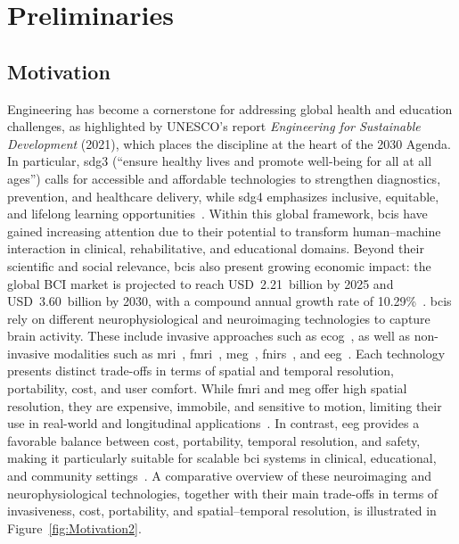 \chapter{Preliminaries}

\section{Motivation} Engineering has become a cornerstone for addressing global health and education challenges, as highlighted by UNESCO’s report \emph{Engineering for Sustainable Development} (2021), which places the discipline at the heart of the 2030 Agenda. In particular, \gls{sdg3} (“ensure healthy lives and promote well-being for all at all ages”) calls for accessible and affordable technologies to strengthen diagnostics, prevention, and healthcare delivery, while \gls{sdg4} emphasizes inclusive, equitable, and lifelong learning opportunities~\cite{nair2021engineering,de2018agenda}. Within this global framework, \glspl{bci} have gained increasing attention due to their potential to transform human–machine interaction in clinical, rehabilitative, and educational domains. Beyond their scientific and social relevance, \glspl{bci} also present growing economic impact: the global BCI market is projected to reach USD~2.21~billion by 2025 and USD~3.60~billion by 2030, with a compound annual growth rate of 10.29\%~\cite{mordor2025bci}. \glspl{bci} rely on different neurophysiological and neuroimaging technologies to capture brain activity. These include invasive approaches such as \gls{ecog}~\cite{leuthardt2004ecog}, as well as non-invasive modalities such as \gls{mri}~\cite{logothetis2008fmri}, \gls{fmri}~\cite{logothetis2008fmri}, \gls{meg}~\cite{hamalainen1993meg}, \gls{fnirs}~\cite{naseer2015fnirs}, and \gls{eeg}~\cite{vidaurre2011brain}. Each technology presents distinct trade-offs in terms of spatial and temporal resolution, portability, cost, and user comfort. While \gls{fmri} and \gls{meg} offer high spatial resolution, they are expensive, immobile, and sensitive to motion, limiting their use in real-world and longitudinal applications~\cite{logothetis2008fmri}. In contrast, \gls{eeg} provides a favorable balance between cost, portability, temporal resolution, and safety, making it particularly suitable for scalable \gls{bci} systems in clinical, educational, and community settings~\cite{chaudhary2025noninvasive}. A comparative overview of these neuroimaging and neurophysiological technologies, together with their main trade-offs in terms of invasiveness, cost, portability, and spatial--temporal resolution, is illustrated in Figure~\ref{fig:Motivation2}.

